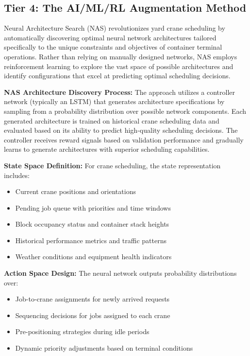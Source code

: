 \documentclass{article}
\begin{document}
\subsection{Tier 4: The AI/ML/RL Augmentation Method}

Neural Architecture Search (NAS) revolutionizes yard crane scheduling by automatically discovering optimal neural network architectures tailored specifically to the unique constraints and objectives of container terminal operations. Rather than relying on manually designed networks, NAS employs reinforcement learning to explore the vast space of possible architectures and identify configurations that excel at predicting optimal scheduling decisions.

\textbf{NAS Architecture Discovery Process:} The approach utilizes a controller network (typically an LSTM) that generates architecture specifications by sampling from a probability distribution over possible network components. Each generated architecture is trained on historical crane scheduling data and evaluated based on its ability to predict high-quality scheduling decisions. The controller receives reward signals based on validation performance and gradually learns to generate architectures with superior scheduling capabilities.

\textbf{State Space Definition:} For crane scheduling, the state representation includes:
\begin{itemize}
\item Current crane positions and orientations  
\item Pending job queue with priorities and time windows
\item Block occupancy status and container stack heights
\item Historical performance metrics and traffic patterns
\item Weather conditions and equipment health indicators
\end{itemize}

\textbf{Action Space Design:} The neural network outputs probability distributions over:
\begin{itemize}
\item Job-to-crane assignments for newly arrived requests
\item Sequencing decisions for jobs assigned to each crane  
\item Pre-positioning strategies during idle periods
\item Dynamic priority adjustments based on terminal conditions
\end{itemize}
\end{document}

